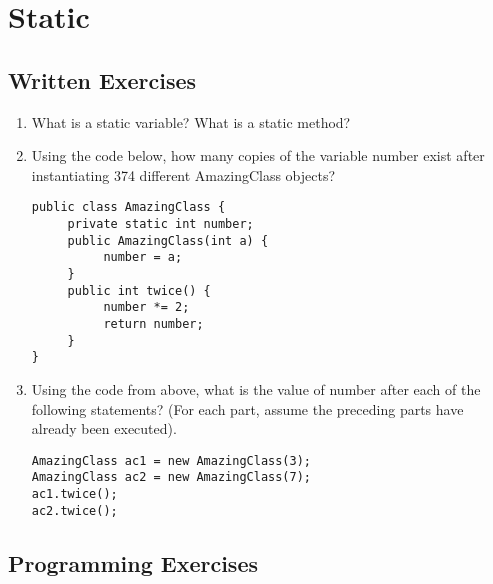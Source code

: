 \section{Static}

\subsection{Written Exercises}

\setcounter{counter}{1}
\begin{enumerate}[label={\arabic{counter}\addtocounter{counter}{1}}.]

\item What is a static variable? What is a static method?

\item Using the code below, how many copies of the variable number exist after instantiating 374 different AmazingClass objects?
\begin{lstlisting}
public class AmazingClass {
     private static int number;
     public AmazingClass(int a) {
          number = a;
     }
     public int twice() {
          number *= 2;
          return number;
     }
}
\end{lstlisting}

\item Using the code from above, what is the value of number after each of the following statements? (For each part, assume the preceding parts have already been executed).
\begin{lstlisting}
AmazingClass ac1 = new AmazingClass(3);
AmazingClass ac2 = new AmazingClass(7);
ac1.twice();
ac2.twice();
\end{lstlisting}

\end{enumerate}

\subsection{Programming Exercises}
